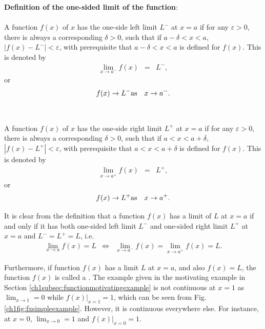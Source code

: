 \begin{VF}
\textbf{Definition of the one-sided limit of the function}:
\\
\\
\noindent A function $f(x)$ of $x$ has the one-side left limit $L^-$ at $x=a$ if for any $\varepsilon > 0$, there is always a corresponding $\delta > 0$, such that if $a-\delta<x<a$, $|f(x)-L^-| < \varepsilon$, with prerequisite that $a-\delta<x<a$ is defined for $f(x)$. This is denoted by
\begin{eqnarray}
   \lim_{x\rightarrow a^-} f(x) &=& L^-, \nonumber
\end{eqnarray}
or
\begin{eqnarray}
  f(x) \rightarrow L^- & \textup{as} & x \rightarrow a^-. \nonumber
\end{eqnarray}
\\
\\
\noindent A function $f(x)$ of $x$ has the one-side right limit $L^+$ at $x=a$ if for any $\varepsilon > 0$, there is always a corresponding $\delta > 0$, such that if $a<x<a+\delta$, $|f(x)-L^+| < \varepsilon$, with prerequisite that $a<x<a+\delta$ is defined for $f(x)$. This is denoted by
\begin{eqnarray}
   \lim_{x\rightarrow a^+} f(x) &=& L^+, \nonumber
\end{eqnarray}
or
\begin{eqnarray}
  f(x) \rightarrow L^+ & \textup{as} & x \rightarrow a^+. \nonumber
\end{eqnarray}
\end{VF}

It is clear from the definition that a function $f(x)$ has a limit of $L$ at $x=a$ if and only if it has both one-sided left limit $L^-$ and one-sided right limit $L^+$ at $x=a$ and $L^-=L^+=L$, i.e.
\begin{eqnarray}
  \lim_{x\rightarrow a}f(x)=L &\Leftrightarrow& \lim_{x\rightarrow a^-}f(x) = \lim_{x\rightarrow a^+}f(x) = L. \nonumber
\end{eqnarray}

Furthermore, if function $f(x)$ has a limit $L$ at $x=a$, and also $f(x)=L$, the function $f(x)$ is called a . The example given in the motivating example in Section \ref{ch1subsec:functionmotivatingexample} is not continuous at $x=1$ as $\lim_{x\rightarrow 1}=0$ while $\left.f(x)\right|_{x=1}=1$, which can be seen from Fig. \ref{ch1fig:fxsimpleexample}. However, it is continuous everywhere else. For instance, at $x=0$, $\lim_{x\rightarrow 0}=1$ and $\left.f(x)\right|_{x=0}=1$.

